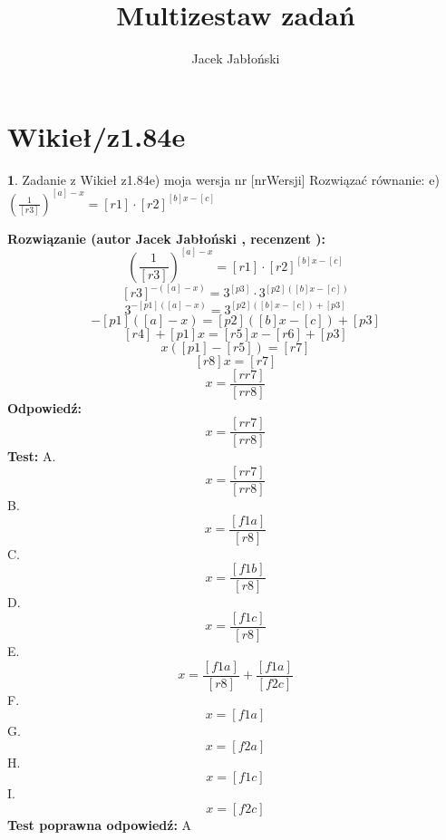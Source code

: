 \documentclass[12pt, a4paper]{article}
\title{Multizestaw zadań}
\author{Jacek Jabłoński}
\date{}
\theoremstyle{definition} %
\newtheorem{zad}{}
\newcommand{\kategoria}[1]{\section{#1}} %
\newcommand{\zadStart}[1]{\begin{zad}#1\newline} %
\newcommand{\zadStop}{\end{zad}}   %
\newcommand{\rozwStart}[2]{\noindent \textbf{Rozwiązanie (autor #1 , recenzent #2): }\newline} %
\newcommand{\rozwStop}{\newline}                                            %
\newcommand{\odpStart}{\noindent \textbf{Odpowiedź:}\newline}    %
\newcommand{\odpStop}{\newline}                                             %
\newcommand{\testStart}{\noindent \textbf{Test:}\newline} %
\newcommand{\testStop}{\newline} %
\newcommand{\kluczStart}{\noindent \textbf{Test poprawna odpowiedź:}\newline} %
\newcommand{\kluczStop}{\newline} %
\begin{document}
\maketitle


\kategoria{Wikieł/z1.84e}
\zadStart{Zadanie z Wikieł z1.84e) moja wersja nr [nrWersji]}
Rozwiązać równanie:
e) $(\frac{1}{[r3]})^{[a]-x} = [r1] \cdot [r2]^{[b] x - [c]}$
\zadStop
\rozwStart{Jacek Jabłoński}{}
$$(\frac{1}{[r3]})^{[a]-x} = [r1] \cdot [r2]^{[b] x - [c]}$$
$$[r3]^{-([a]-x)} = 3^{[p3]} \cdot 3^{[p2]([b] x - [c])}$$
$$3^{-[p1]([a]-x)} = 3^{[p2]([b]x-[c]) + [p3]}$$
$$ -[p1]([a]-x) = [p2]([b]x-[c]) + [p3]$$
$$[r4] + [p1]x = [r5]x - [r6] +[p3]$$
$$x([p1]-[r5]) = [r7]$$
$$[r8]x = [r7]$$
$$ x = \frac{[rr7]}{[rr8]}$$
\rozwStop
\odpStart
$$ x = \frac{[rr7]}{[rr8]}$$
\odpStop
\testStart
A. $$ x = \frac{[rr7]}{[rr8]}$$
B. $$ x = \frac{[f1a]}{[r8]}$$
C. $$ x = \frac{[f1b]}{[r8]}$$
D. $$ x = \frac{[f1c]}{[r8]}$$
E. $$ x = \frac{[f1a]}{[r8]} + \frac{[f1a]}{[f2c]}$$
F. $$ x = [f1a]$$
G. $$ x = [f2a]$$
H. $$ x = [f1c]$$
I. $$ x = [f2c]$$
\testStop
\kluczStart
A
\kluczStop
\end{document}
